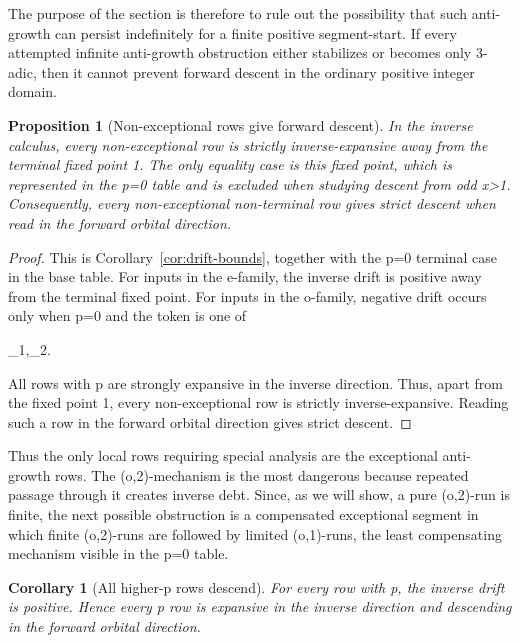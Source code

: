 \documentclass[11pt,letterpaper]{amsart}
\def\mathrm#1{#1}%
\def\({}%
\def\){}%
\def\[{ }%
\def\]{ }%
\theoremstyle{definition}
\theoremstyle{plain}
\newtheorem{proposition}{Proposition}
\theoremstyle{plain}
\newtheorem{corollary}[theorem]{Corollary}
\theoremstyle{remark}
\begin{document}
The purpose of the section is therefore to rule out the possibility that
such anti-growth can persist indefinitely for a finite positive
segment-start.  If every attempted infinite anti-growth obstruction
either stabilizes or becomes only \(3\)-adic, then it cannot prevent
forward descent in the ordinary positive integer domain.

\begin{proposition}[Non-exceptional rows give forward descent]
\label{prop:nonexceptional-rows-forward-descent}
In the inverse calculus, every non-exceptional row is strictly
inverse-expansive away from the terminal fixed point \(1\).  The
only equality case is this fixed point, which is represented in the
\(p=0\) table and is excluded when studying descent from odd \(x>1\).
Consequently, every non-exceptional non-terminal row gives strict descent
when read in the forward orbital direction.
\end{proposition}

\begin{proof}
This is Corollary~\ref{cor:drift-bounds}, together with the \(p=0\)
terminal case in the base table.  For inputs in the \(\mathrm{e}\)-family,
the inverse drift is positive away from the terminal fixed point.  For
inputs in the \(\mathrm{o}\)-family, negative drift occurs only when
\(p=0\) and the token is one of
\[
\omega_1,\qquad \Omega_2.
\]
All rows with \(p\) are strongly expansive in the inverse direction.
Thus, apart from the fixed point \(1\), every non-exceptional row
is strictly inverse-expansive.  Reading such a row in the forward orbital
direction gives strict descent.
\end{proof}

Thus the only local rows requiring special analysis are the exceptional
anti-growth rows.  The \((o,2)\)-mechanism is the most dangerous because repeated passage
through it creates inverse debt.  Since, as we will show, a pure
\((o,2)\)-run is finite, the next possible obstruction is a compensated
exceptional segment in which finite \((o,2)\)-runs are followed by
limited \((o,1)\)-runs, the least compensating mechanism visible in the
\(p=0\) table.

\begin{corollary}[All higher-\(p\) rows descend]
\label{cor:higher-p-rows-descend}
For every row with \(p\), the inverse drift is positive.  Hence
every \(p\) row is expansive in the inverse direction and descending
in the forward orbital direction.
\end{corollary}
\end{document}
